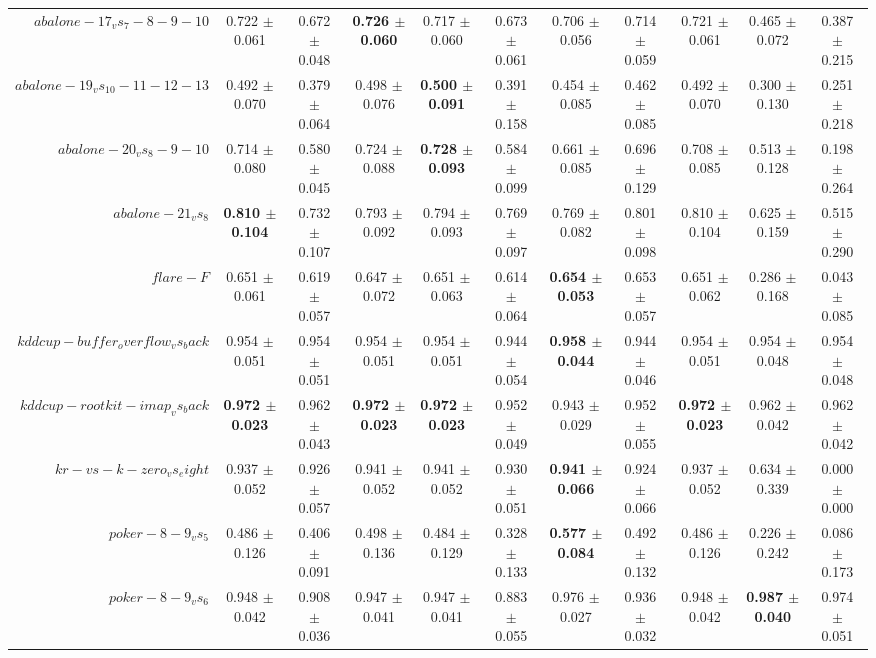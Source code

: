 \begin{table}[!ht]
{\begin{tabular}{r c c c c c c c c c c}
$abalone-17_vs_7-8-9-10$ & 0.722 $\pm$ 0.061 & 0.672 $\pm$ 0.048 & \textbf{0.726 $\pm$ 0.060} & 0.717 $\pm$ 0.060 & 0.673 $\pm$ 0.061 & 0.706 $\pm$ 0.056 & 0.714 $\pm$ 0.059 & 0.721 $\pm$ 0.061 & 0.465 $\pm$ 0.072 & 0.387 $\pm$ 0.215 \\
$abalone-19_vs_10-11-12-13$ & 0.492 $\pm$ 0.070 & 0.379 $\pm$ 0.064 & 0.498 $\pm$ 0.076 & \textbf{0.500 $\pm$ 0.091} & 0.391 $\pm$ 0.158 & 0.454 $\pm$ 0.085 & 0.462 $\pm$ 0.085 & 0.492 $\pm$ 0.070 & 0.300 $\pm$ 0.130 & 0.251 $\pm$ 0.218 \\
$abalone-20_vs_8-9-10$ & 0.714 $\pm$ 0.080 & 0.580 $\pm$ 0.045 & 0.724 $\pm$ 0.088 & \textbf{0.728 $\pm$ 0.093} & 0.584 $\pm$ 0.099 & 0.661 $\pm$ 0.085 & 0.696 $\pm$ 0.129 & 0.708 $\pm$ 0.085 & 0.513 $\pm$ 0.128 & 0.198 $\pm$ 0.264 \\
$abalone-21_vs_8$ & \textbf{0.810 $\pm$ 0.104} & 0.732 $\pm$ 0.107 & 0.793 $\pm$ 0.092 & 0.794 $\pm$ 0.093 & 0.769 $\pm$ 0.097 & 0.769 $\pm$ 0.082 & 0.801 $\pm$ 0.098 & 0.810 $\pm$ 0.104 & 0.625 $\pm$ 0.159 & 0.515 $\pm$ 0.290 \\
$flare-F$ & 0.651 $\pm$ 0.061 & 0.619 $\pm$ 0.057 & 0.647 $\pm$ 0.072 & 0.651 $\pm$ 0.063 & 0.614 $\pm$ 0.064 & \textbf{0.654 $\pm$ 0.053} & 0.653 $\pm$ 0.057 & 0.651 $\pm$ 0.062 & 0.286 $\pm$ 0.168 & 0.043 $\pm$ 0.085 \\
$kddcup-buffer_overflow_vs_back$ & 0.954 $\pm$ 0.051 & 0.954 $\pm$ 0.051 & 0.954 $\pm$ 0.051 & 0.954 $\pm$ 0.051 & 0.944 $\pm$ 0.054 & \textbf{0.958 $\pm$ 0.044} & 0.944 $\pm$ 0.046 & 0.954 $\pm$ 0.051 & 0.954 $\pm$ 0.048 & 0.954 $\pm$ 0.048 \\
$kddcup-rootkit-imap_vs_back$ & \textbf{0.972 $\pm$ 0.023} & 0.962 $\pm$ 0.043 & \textbf{0.972 $\pm$ 0.023} & \textbf{0.972 $\pm$ 0.023} & 0.952 $\pm$ 0.049 & 0.943 $\pm$ 0.029 & 0.952 $\pm$ 0.055 & \textbf{0.972 $\pm$ 0.023} & 0.962 $\pm$ 0.042 & 0.962 $\pm$ 0.042 \\
$kr-vs-k-zero_vs_eight$ & 0.937 $\pm$ 0.052 & 0.926 $\pm$ 0.057 & 0.941 $\pm$ 0.052 & 0.941 $\pm$ 0.052 & 0.930 $\pm$ 0.051 & \textbf{0.941 $\pm$ 0.066} & 0.924 $\pm$ 0.066 & 0.937 $\pm$ 0.052 & 0.634 $\pm$ 0.339 & 0.000 $\pm$ 0.000 \\
$poker-8-9_vs_5$ & 0.486 $\pm$ 0.126 & 0.406 $\pm$ 0.091 & 0.498 $\pm$ 0.136 & 0.484 $\pm$ 0.129 & 0.328 $\pm$ 0.133 & \textbf{0.577 $\pm$ 0.084} & 0.492 $\pm$ 0.132 & 0.486 $\pm$ 0.126 & 0.226 $\pm$ 0.242 & 0.086 $\pm$ 0.173 \\
$poker-8-9_vs_6$ & 0.948 $\pm$ 0.042 & 0.908 $\pm$ 0.036 & 0.947 $\pm$ 0.041 & 0.947 $\pm$ 0.041 & 0.883 $\pm$ 0.055 & 0.976 $\pm$ 0.027 & 0.936 $\pm$ 0.032 & 0.948 $\pm$ 0.042 & \textbf{0.987 $\pm$ 0.040} & 0.974 $\pm$ 0.051 \\

\end{tabular}}
\end{table}
